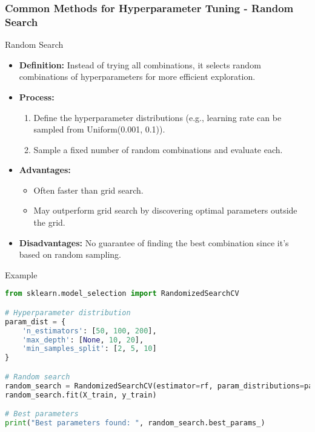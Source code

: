 \documentclass[aspectratio=169]{beamer}
\begin{document}
\begin{frame}[fragile]
    \frametitle{Common Methods for Hyperparameter Tuning - Random Search}
    \begin{block}{Random Search}
        \begin{itemize}
            \item \textbf{Definition:} Instead of trying all combinations, it selects random combinations of hyperparameters for more efficient exploration.
            \item \textbf{Process:}
            \begin{enumerate}
                \item Define the hyperparameter distributions (e.g., learning rate can be sampled from Uniform(0.001, 0.1)).
                \item Sample a fixed number of random combinations and evaluate each.
            \end{enumerate}
            \item \textbf{Advantages:} 
            \begin{itemize}
                \item Often faster than grid search.
                \item May outperform grid search by discovering optimal parameters outside the grid.
            \end{itemize}
            \item \textbf{Disadvantages:} No guarantee of finding the best combination since it's based on random sampling.
        \end{itemize}
    \end{block}

    \begin{block}{Example}
        \begin{lstlisting}[language=Python]
from sklearn.model_selection import RandomizedSearchCV

# Hyperparameter distribution
param_dist = {
    'n_estimators': [50, 100, 200],
    'max_depth': [None, 10, 20],
    'min_samples_split': [2, 5, 10]
}

# Random search
random_search = RandomizedSearchCV(estimator=rf, param_distributions=param_dist, n_iter=10, cv=5)
random_search.fit(X_train, y_train)

# Best parameters
print("Best parameters found: ", random_search.best_params_)
        \end{lstlisting}
    \end{block}
\end{frame}
\end{document}
